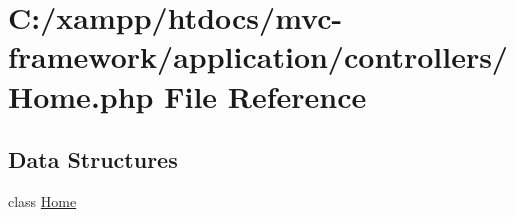 \hypertarget{controllers_2_home_8php}{}\section{C\+:/xampp/htdocs/mvc-\/framework/application/controllers/\+Home.php File Reference}
\label{controllers_2_home_8php}
\subsection*{Data Structures}
\begin{DoxyCompactItemize}
\item 
class \hyperlink{class_home}{Home}
\end{DoxyCompactItemize}
